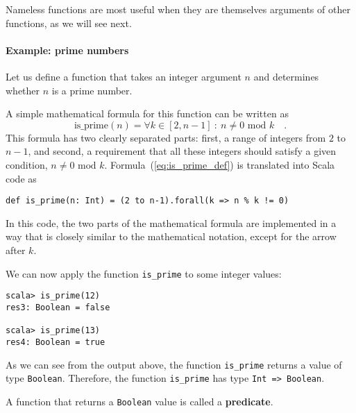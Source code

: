 Nameless functions are most useful when they are themselves arguments
of other functions, as we will see next.

\paragraph{Example: prime numbers}

Let us define a function that takes an integer argument $n$ and determines
whether $n$ is a prime number.

A simple mathematical formula for this function can be written as
\begin{equation}
\text{is\_prime}\left(n\right)=\forall k\in\left[2,n-1\right]\ :\ n\neq0\text{ mod }k\quad.\label{eq:is_prime_def}
\end{equation}
This formula has two clearly separated parts: first, a range of integers
from $2$ to $n-1$, and second, a requirement that all these integers
should satisfy a given condition, $n\neq0\text{ mod }k$. Formula~(\ref{eq:is_prime_def})
is translated into Scala code as
\begin{lstlisting}
def is_prime(n: Int) = (2 to n-1).forall(k => n % k != 0)
\end{lstlisting}
In this code, the two parts of the mathematical formula are implemented
in a way that is closely similar to the mathematical notation, except
for the arrow after $k$.

We can now apply the function \lstinline!is_prime!
to some integer values:
\begin{lstlisting}
scala> is_prime(12)
res3: Boolean = false

scala> is_prime(13)
res4: Boolean = true
\end{lstlisting}
As we can see from the output above, the function \lstinline!is_prime!
returns a value of type \lstinline!Boolean!.
Therefore, the function \lstinline!is_prime!
has type \lstinline!Int => Boolean!.

A function that returns a \lstinline!Boolean!
value is called a \textbf{predicate}.

